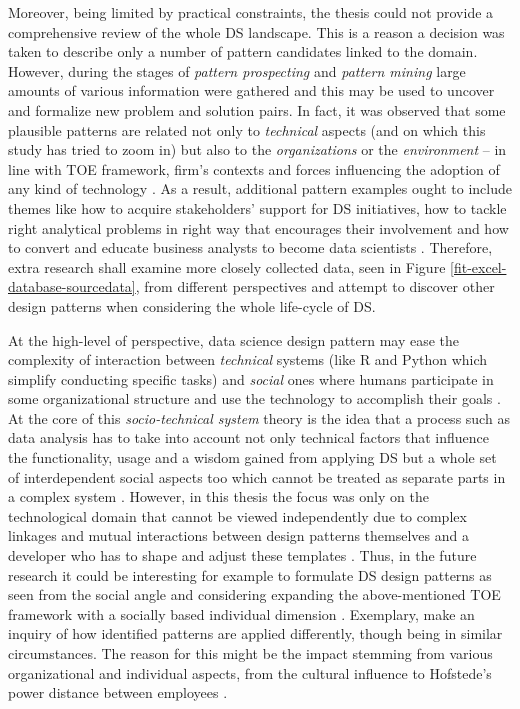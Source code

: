 Moreover, being limited by practical constraints, the thesis could not provide a comprehensive review of the whole \ac{DS} landscape. 
This is a reason a decision was taken to describe only a number of pattern candidates linked to the domain. 
However, during the stages of \emph{pattern prospecting} and \emph{pattern mining} large amounts of various information were gathered and this may be used to uncover and formalize new problem and solution pairs. 
In fact, it was observed that some plausible patterns are related not only to \emph{technical} aspects (and on which this study has tried to zoom in) but also to the \emph{organizations} or the \emph{environment} -- in line with TOE framework, firm's contexts and forces influencing the adoption of any kind of technology \parencites{BakerTOE2012}{tornatzky1990processes}{OlivertraTOE2011}.
As a result, additional pattern examples ought to include themes like how to acquire stakeholders' support for \ac{DS} initiatives, how to tackle right analytical problems in right way that encourages their involvement and how to convert and educate business analysts to become data scientists \parencites{Fern2016}{SAS2016}{CarlShan2015TheScientists}.  
Therefore, extra research shall examine more closely collected data, seen in Figure \ref{fit-excel-database-sourcedata}, from different perspectives and attempt to discover other design patterns when considering the whole life-cycle of \ac{DS}. 

At the high-level of perspective, data science design pattern may ease the complexity of interaction between \emph{technical} systems (like R and Python which simplify conducting specific tasks) and \emph{social} ones where humans participate in some organizational structure and use the technology to accomplish their goals \parencites{WandaSusan2008}{BrianSTS2009}.
At the core of this \emph{socio-technical system} theory is the idea that a process such as data analysis has to take into account not only technical factors that influence the functionality, usage and a wisdom gained from applying \ac{DS} but a whole set of interdependent social aspects too which cannot be treated as separate parts in a complex system \parencite{BaxterST2011}.
However, in this thesis the focus was only on the technological domain that cannot be viewed independently due to  complex linkages and mutual interactions between design patterns themselves and a developer who has to shape and adjust these templates \parencite{Fowler2002}. 
Thus, in the future research it could be interesting for example to formulate \ac{DS} design patterns as seen from the social angle and considering expanding the above-mentioned TOE framework with a socially based individual dimension \parencite{PetrovAarhus16}. 
Exemplary, make an inquiry of how identified patterns are applied differently, though being in similar circumstances.
The reason for this might be the impact stemming from various organizational and individual aspects, from the cultural influence to Hofstede's power distance between employees \parencites{Holfstede1993}{Holfestede2011}.

